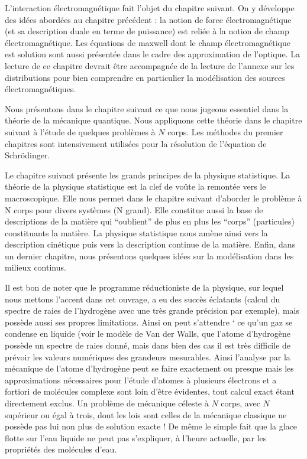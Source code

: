 \documentclass[12pt]{book}
\begin{document}
L'interaction \'electromagn\'etique fait l'objet du chapitre suivant. 
On y d\'eveloppe des id\'ees abord\'ees au chapitre pr\'ec\'edent : la notion
de force \'electromagn\'etique (et sa description duale en terme de puissance)
est reli\'ee \`a la notion de champ \'electromagn\'etique. Les \'equations de
maxwell dont le champ \'electromagn\'etique est solution sont aussi
pr\'esent\'ee dans le cadre des approximation de l'optique.
La lecture
de ce chapitre devrait \^etre accompagn\'ee
de la lecture de l'annexe sur les distributions pour bien comprendre en
particulier la mod\'elisation des sources \'electromagn\'etiques. 

Nous pr\'esentons dans le chapitre suivant ce que nous jugeons essentiel dans
la th\'eorie de la m\'ecanique quantique. Nous appliquons cette th\'eorie dans
le chapitre suivant \`a l'\'etude de quelques probl\`emes \`a $N$ corps.
Les m\'ethodes du premier chapitres sont intensivement utilis\'ees pour la
r\'esolution de l'\'equation de Schr\"odinger.

Le chapitre suivant pr\'esente les grands principes de la physique
statistique. La th\'eorie de la physique statistique est la clef de vo\^ute  la
remont\'ee vers le macroscopique. 
Elle nous permet dans le chapitre suivant d'aborder le probl\`eme \`a N corps
pour divers syst\`emes (N grand).
Elle constitue aussi la base de descriptions de la mati\`ere qui ``oublient''
de 
plus en plus les ``corps'' (particules) constituants la mati\`ere. La physique
statistique nous am\`ene ainsi vers la description cin\'etique puis vers la
description continue de la mati\`ere. Enfin, dans un dernier chapitre, nous
pr\'esentons quelques id\'ees sur la mod\'elisation dans les milieux continus.



Il est bon de noter que le programme r\'eductioniste de la physique, sur lequel
nous mettons l'accent dans cet ouvrage, a eu des
succ\`es 
\'eclatants (calcul du spectre de raies de l'hydrog\`ene avec une tr\`es grande
pr\'ecision par exemple), mais poss\`ede aussi ses propres limitations. Ainsi
on peut 
s'attendre \a` ce qu'un gaz se condense en liquide (voir le mod\`ele
de Van der Walls, que l'atome d'hydrog\`ene poss\`ede un spectre de
raies donn\'e, mais dans bien des cas il est tr\`es difficile de
pr\'evoir les valeurs num\'eriques des grandeurs mesurables. Ainsi
l'analyse par la m\'ecanique de l'atome d'hydrog\`ene peut se faire
exactement ou presque mais les approximations n\'ecessaires pour
l'\'etude d'atomes \`a plusieurs \'electrons et a fortiori de
mol\'ecules complexe sont loin d'\^etre \'evidentes, tout calcul exact
\'etant directement exclus. Un probl\`eme de m\'ecanique c\'eleste \`a
$N$ corps, avec $N$ sup\'erieur ou \'egal \`a trois, dont
les lois sont celles de la m\'ecanique classique ne poss\`ede pas lui
non plus de solution exacte ! De m\^eme le simple fait que la glace
flotte sur 
l'eau liquide ne peut pas s'expliquer, \`a l'heure actuelle,
par les propri\'et\'es des mol\'ecules d'eau.
\end{document}
